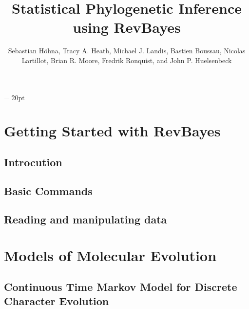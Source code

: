 \documentclass[11pt]{book}
\begin{document}
\renewcommand{\headrulewidth}{0.5pt}
\headsep = 20pt
\lhead{ }


\title{\Huge \textbf{Statistical Phylogenetic Inference using RevBayes} }
\author{
Sebastian H{\"o}hna,
Tracy A. Heath,
Michael J. Landis,
Bastien Boussau,
Nicolas Lartillot,
Brian R. Moore,
Fredrik Ronquist, and
John P. Huelsenbeck
}


\maketitle

\tableofcontents

\def \GlobalResourcePath {./}

\part{Getting Started with RevBayes}

\chapter{Introcution}
\def \ResourcePath {RB_Getting_Started/}


\chapter{Basic Commands}
\def \ResourcePath {RB_Basics_Tutorial/}


\chapter{Reading and manipulating data}
\def \ResourcePath {RB_Data_Tutorial/}




\part{Models of Molecular Evolution}

\chapter{Continuous Time Markov Model for Discrete Character Evolution}
\def \ResourcePath {RB_CTMC_Tutorial/}

\end{document}
